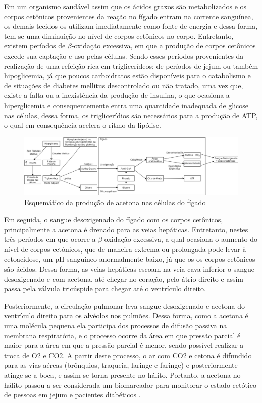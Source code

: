 Em um organismo saudável assim que os ácidos graxos são metabolizados e os corpos cetônicos provenientes da reação no fígado entram na corrente sanguínea, os demais tecidos os utilizam imediatamente como fonte de energia e dessa forma, tem-se uma diminuição no nível de corpos cetônicos no corpo. Entretanto, existem períodos de $\beta$-oxidação excessiva, em que a produção de corpos cetônicos excede sua captação e uso pelas células. Sendo  esses períodos provenientes da realização de uma refeição rica em triglicerídeos; de períodos de jejum ou também hipoglicemia, já que poucos carboidratos estão disponíveis para o catabolismo e de situações de diabetes mellitus descontrolado ou não tratado, uma vez que, existe a falta ou a inexistência da produção de insulina, o que ocasiona a hiperglicemia e consequentemente entra uma quantidade inadequada de glicose nas células, dessa forma, os triglicerídios são necessários para a produção de ATP, o qual em consequência acelera o ritmo da lipólise.


\begin{figure}[H]
 \begin{center}
  \includegraphics[width=\textwidth]{figuras/esq_figado.png}
   \caption{{Esquemático da produção de acetona nas células do fígado}}\label{esq_figado}
  \end{center}
\end{figure}


Em seguida, o sangue desoxigenado do fígado com os corpos cetônicos, principalmente a acetona é drenado para as veias hepáticas. Entretanto, nestes três períodos em que ocorre a $\beta$-oxidação excessiva,  a qual ocasiona o aumento do nível de corpos cetônicos, que de maneira extrema ou prolongada pode levar à cetoacidose, um pH sanguíneo anormalmente baixo, já que os os corpos cetônicos são ácidos. Dessa forma, as veias hepáticas escoam na veia cava inferior o sangue desoxigenado e com acetona, até chegar no coração, pelo átrio direito e assim passa pela válvula tricúspide para chegar até o ventrículo direito. 

Posteriormente, a circulação pulmonar leva sangue desoxigenado e acetona do ventrículo direito para os alvéolos nos pulmões. Dessa forma, como a acetona é uma molécula pequena ela participa dos processos de difusão passiva na membrana respiratória, e o processo ocorre da área em que pressão parcial é maior para a área em que a pressão parcial é menor, sendo possível realizar a troca de O2 e CO2. A partir deste processo, o ar com CO2 e cetona é difundido para as vias aéreas (brônquios, traqueia, laringe e faringe) e posteriormente atinge-se a boca, e assim se torna presente no hálito. Portanto, a acetona no hálito passou a ser considerada um biomarcador para monitorar o estado cetótico de pessoas em jejum e pacientes diabéticos \cite{King2011}.

